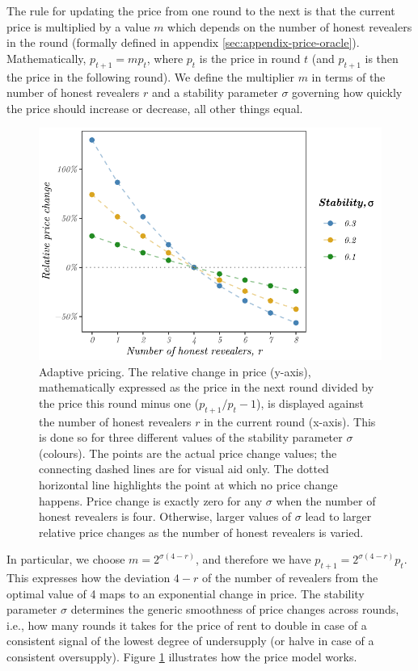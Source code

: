 The rule for updating the price from one round to the next is that the current price is multiplied by a value $m$ which depends on the number of honest revealers in the round (formally defined in appendix \ref{sec:appendix-price-oracle}). Mathematically, $p_{t+1} = m p_t$, where $p_t$ is the price in round $t$ (and $p_{t+1}$ is then the price in the following round). We define the multiplier $m$ in terms of the number of honest revealers $r$ and a stability parameter $\sigma$ governing how quickly the price should increase or decrease, all other things equal. 

\begin{figure}[!ht]
  \centering
  \includegraphics[width=.7\textwidth]{fig/adaptive-pricing.pdf}
  \caption[Adaptive pricing] {Adaptive pricing. The relative change in price (y-axis), mathematically expressed as the price in the next round divided by the price this round minus one ($p_{t+1} / p_t - 1$), is displayed against the number of honest revealers $r$ in the current round (x-axis). This is done so for three different values of the stability parameter $\sigma$ (colours). The points are the actual price change values; the connecting dashed lines are for visual aid only. The dotted horizontal line highlights the point at which no price change happens. Price change is exactly zero for any $\sigma$ when the number of honest revealers is four. Otherwise, larger values of $\sigma$ lead to larger relative price changes as the number of honest revealers is varied.}
  \label{fig:adaptive-pricing}
\end{figure}

In particular, we choose $m = 2^{\sigma(4 - r)}$, and therefore we have $p_{t+1} = 2^{\sigma(4 - r)} p_t$. This expresses how the deviation $4 - r$ of the number of revealers from the optimal value of 4 maps to an exponential change in price. The stability parameter $\sigma$ determines the generic smoothness of price changes across rounds, i.e., how many rounds it takes for the price of rent to double in case of a consistent signal of the lowest degree of undersupply (or halve in case of a consistent oversupply). Figure \ref{fig:adaptive-pricing} illustrates how the price model works.

